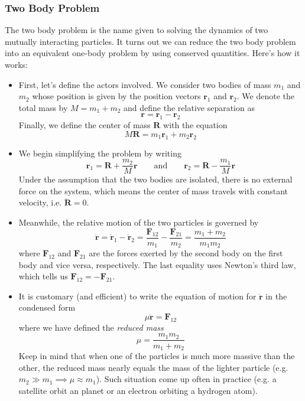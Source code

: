 \documentclass[11pt, a4paper]{article}
\newcommand{\eqtext}[1]{\qquad \text{#1} \qquad}
\newcommand{\bddot}[1]{\ddot{\bm{#1}}} %
\begin{document}
\subsubsection{Two Body Problem}
The two body problem is the name given to solving the dynamics of two mutually interacting particles. It turns out we can reduce the two body problem into an equivalent one-body problem by using conserved quantities. Here's how it works:
\begin{itemize}
	\item First, let's define the actors involved. We consider two bodies of mass $ m_{1} $ and $ m_{2} $ whose position is given by the position vectors $ \bm{r}_{1} $ and $ \bm{r}_{2} $. We denote the total mass by $ M = m_{1} + m_{2} $ and define the relative separation as
	\begin{equation*}
		\bm{r} = \bm{r}_{1} - \bm{r}_{2}
	\end{equation*}
	Finally, we define the center of mass $ \bm{R} $ with the equation
	\begin{equation*}
		M\bm{R} = m_{1}\bm{r}_{1} + m_{2} \bm{r}_{2}
	\end{equation*}
	
	\item We begin simplifying the problem by writing
	\begin{equation*}
		\bm{r}_{1} = \bm{R} + \frac{m_{2}}{M}\bm{r} \eqtext{and} \bm{r}_{2} = \bm{R} - \frac{m_{1}}{M}\bm{r}
	\end{equation*}
	Under the assumption that the two bodies are isolated, there is no external force on the system, which means the center of mass travels with constant velocity, i.e. $ \bddot{R} = 0 $.
	
	\item Meanwhile, the relative motion of the two particles is governed by
	\begin{equation*}
		\bddot{r} = \bddot{r}_{1} - \bddot{r}_{2} = \frac{\bm{F}_{12}}{m_{1}} -  \frac{\bm{F}_{21}}{m_{2}} = \frac{m_{1} + m_{2}}{m_{1}m_{2}}
	\end{equation*}
	where $ \bm{F}_{12} $ and $ \bm{F}_{21} $ are the forces exerted by the second body on the first body and vice versa, respectively. The last equality uses Newton's third law, which tells us $ \bm{F}_{12} = - \bm{F}_{21} $. 
	
	\item It is customary (and efficient) to write the equation of motion for $ \bddot{r} $ in the condensed form
	\begin{equation*}
		\mu \bddot{r} = \bm{F}_{12}
	\end{equation*}
	where we have defined the \textit{reduced mass}
	\begin{equation*}
		\mu = \frac{m_{1}m_{2}}{m_{1} + m_{2}}
	\end{equation*}
	Keep in mind that when one of the particles is much more massive than the other, the reduced mass nearly equals the mass of the lighter particle (e.g. $ m_{2} \gg m_{1} \implies \mu \approx m_{1} $). Such situation come up often in practice (e.g. a satellite orbit an planet or an electron orbiting a hydrogen atom).
	

\end{itemize}
\end{document}
